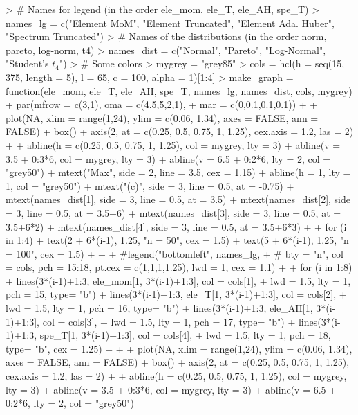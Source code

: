 \documentclass{article}
\begin{document}


\begin{Schunk}
\begin{Sinput}
> # Names for legend (in the order ele_mom, ele_T, ele_AH, spe_T)
> names_lg = c("Element MoM", "Element Truncated", "Element Ada. Huber", "Spectrum Truncated")
> # Names of the distributions (in the order norm, pareto, log-norm, t4)
> names_dist = c("Normal", "Pareto", "Log-Normal", "Student's $t_4$")
> # Some colors
> mygrey = "grey85"
> cols = hcl(h = seq(15, 375, length = 5), l = 65, c = 100, alpha = 1)[1:4]
> make_graph = function(ele_mom, ele_T, ele_AH, spe_T, names_lg, names_dist, cols, mygrey){
+   par(mfrow = c(3,1), oma = c(4.5,5,2,1),
+       mar = c(0,0.1,0.1,0.1))
+ 
+   plot(NA, xlim = range(1,24), ylim = c(0.06, 1.34), axes = FALSE, ann = FALSE)
+   box()
+   axis(2, at = c(0.25, 0.5, 0.75, 1, 1.25), cex.axis = 1.2, las = 2)
+ 
+   abline(h = c(0.25, 0.5, 0.75, 1, 1.25), col = mygrey, lty = 3)
+   abline(v = 3.5 + 0:3*6, col = mygrey, lty = 3)
+   abline(v = 6.5 + 0:2*6, lty = 2, col = "grey50")
+   mtext("Max", side = 2, line = 3.5, cex = 1.15)
+   abline(h = 1, lty = 1, col = "grey50")
+   mtext("(c)", side = 3, line = 0.5, at = -0.75)
+   mtext(names_dist[1], side = 3, line = 0.5, at = 3.5)
+   mtext(names_dist[2], side = 3, line = 0.5, at = 3.5+6)
+   mtext(names_dist[3], side = 3, line = 0.5, at = 3.5+6*2)
+   mtext(names_dist[4], side = 3, line = 0.5, at = 3.5+6*3)
+ 
+   for (i in 1:4){
+     text(2 + 6*(i-1), 1.25, "n = 50", cex = 1.5)
+     text(5 + 6*(i-1), 1.25, "n = 100", cex = 1.5)
+   }
+ 
+   #legend("bottomleft", names_lg,
+   #       bty = "n", col = cols, pch = 15:18, pt.cex = c(1,1,1,1.25), lwd = 1, cex = 1.1)
+ 
+   for (i in 1:8){
+     lines(3*(i-1)+1:3, ele_mom[1, 3*(i-1)+1:3], col = cols[1],
+           lwd = 1.5, lty = 1, pch = 15, type= "b")
+     lines(3*(i-1)+1:3, ele_T[1, 3*(i-1)+1:3], col = cols[2],
+           lwd = 1.5, lty = 1, pch = 16, type= "b")
+     lines(3*(i-1)+1:3, ele_AH[1, 3*(i-1)+1:3], col = cols[3],
+           lwd = 1.5, lty = 1, pch = 17, type= "b")
+     lines(3*(i-1)+1:3, spe_T[1, 3*(i-1)+1:3], col = cols[4],
+           lwd = 1.5, lty = 1, pch = 18, type= "b", cex = 1.25)
+   }
+ 
+   plot(NA, xlim = range(1,24), ylim = c(0.06, 1.34), axes = FALSE, ann = FALSE)
+   box()
+   axis(2, at = c(0.25, 0.5, 0.75, 1, 1.25), cex.axis = 1.2, las = 2)
+ 
+   abline(h = c(0.25, 0.5, 0.75, 1, 1.25), col = mygrey, lty = 3)
+   abline(v = 3.5 + 0:3*6, col = mygrey, lty = 3)
+   abline(v = 6.5 + 0:2*6, lty = 2, col = "grey50")
}
\end{Sinput}
\end{Schunk}
\end{document}
